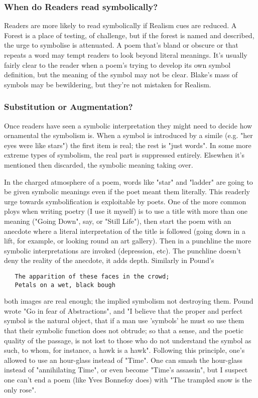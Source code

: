 \documentclass[11pt]{article}
\begin{document}
\subsubsection*{When do Readers read symbolically?}

Readers are more likely to read symbolically if Realism cues are reduced. A Forest is a place of testing, of challenge, but if the forest is named and described, the urge to symbolise is attenuated. A poem that's bland or obscure or that repeats a word may tempt readers to look beyond literal meanings. It's usually fairly clear to the reader when a poem's trying to develop its own symbol definition, but the meaning of the symbol may not be clear. Blake's mass of symbols may be bewildering, but they're not mistaken for Realism.

\subsubsection*{Substitution or Augmentation?}

Once readers have seen a symbolic interpretation they might need to decide how ornamental the symbolism is. When a symbol is introduced by a simile (e.g. "her eyes were like stars") the first item is real; the rest is "just words". In some more extreme types of symbolism, the real part is suppressed entirely. Elsewhen it's mentioned then discarded, the symbolic meaning taking over.

In the charged atmosphere of a poem, words like "star" and "ladder" are going to be given symbolic meanings even if the poet meant them literally. This readerly urge towards symbolification is exploitable by poets. One of the more common ploys when writing poetry (I use it myself) is to use a title with more than one meaning ("Going Down", say, or "Still Life"), then start the poem with an anecdote where a literal interpretation of the title is followed (going down in a lift, for example, or looking round an art gallery). Then in a punchline the more symbolic interpretations are invoked (depression, etc). The punchline doesn't deny the reality of the anecdote, it adds depth. Similarly in Pound's
\begin{verbatim}
   The apparition of these faces in the crowd;
   Petals on a wet, black bough
\end{verbatim}
both images are real enough; the implied symbolism not destroying them. Pound wrote "Go in fear of Abstractions", and "I believe that the proper and perfect symbol is the natural object, that if a man use 'symbols' he must so use them that their symbolic function does not obtrude; so that a sense, and the poetic quality of the passage, is not lost to those who do not understand the symbol as such, to whom, for instance, a hawk is a hawk". Following this principle, one's allowed to use an hour-glass instead of "Time". One can smash the hour-glass instead of "annihilating Time", or even become "Time's assassin", but I suspect one can't end a poem (like Yves Bonnefoy does) with "The trampled snow is the only rose".
\end{document}
